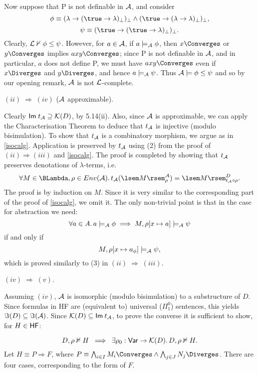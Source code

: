 Now suppose that {\sf P} is not definable in $\cal A$, and consider
\[ \phi \equiv (\lambda \rightarrow (\true \rightarrow \lambda )_{\bot})_{\bot} \wedge (\true \rightarrow ( \lambda \rightarrow \lambda )_{\bot})_{\bot} , \]
\[ \psi \equiv (\true \rightarrow (\true \rightarrow \lambda )_{\bot})_{\bot} . \]
Clearly, ${\cal L} \nvdash \phi \leq \psi$. 
However, for $a \in {\cal A}$, if $a \models_{\cal A} \phi$, then $x \Converges$ or $y \Converges$ implies $a x y \Converges$; 
since {\sf P} is not definable in $\cal A$, and in particular, $a$ does not define {\sf P}, we must have $a x y \Converges$ even if $x \Diverges$ and $y \Diverges$, and hence $a \models_{\cal A} \psi$. 
Thus ${\cal A} \models \phi \leq \psi$ and so by our opening remark, $\cal A$ is not $\cal L$-complete.

\noindent $(ii) \; \Longrightarrow \; (iv)$ ($\cal A$ approximable).

Clearly ${\sf Im} \; t_{\cal A} \supseteq  {\cal K}(D)$, by 5.14(ii). 
Also, since $\cal A$ is approximable, we can apply the Characterisation Theorem 
to deduce that $t_{\cal A}$ is injective (modulo bisimulation). 
To show that $t_{\cal A}$ is a combinatory morphism, we argue as in 
\ref{isocalg}. 
Application is preserved by $t_{\cal A}$ using (2) from the proof of 
$(ii)  \Rightarrow  (iii)$ and \ref{isocalg}. 
The proof is completed by showing that $t_{\cal A}$ preserves denotations of 
$\lambda$-terms, i.e.
\[ \forall M \in \BLambda , \rho \in Env({\cal A}) . \, t_{\cal A} (\lsem M \rsem^{\cal A}_{\rho}) = \lsem M \rsem^{D}_{t_{\cal A} \circ \rho } . \]
The proof is by induction on $M$. 
Since it is very similar to the corresponding part of the proof of \ref{isocalg}, we omit it. 
The only non-trivial point is that in the case for abstraction we need:
\[ \forall a \in A. \, a \models_{\cal A} \phi \; \Longrightarrow \; M, \rho [x \mapsto a ] \models_{\cal A} \psi \]
if and only if
\[ M, \rho [ x \mapsto a_{\phi}] \models_{\cal A} \psi , \]
which is proved similarly to (3) in $(ii) \; \Rightarrow \; (iii)$.

\noindent $(iv) \; \Longrightarrow \; (v)$.

Assuming $(iv)$, $\cal A$ is isomorphic (modulo bisimulation) to a substructure of $D$. 
Since formulas in {\sf HF} are (equivalent to) universal ($\Pi^{0}_{1}$) 
sentences, this yields ${\Im}(D) \subseteq {\Im}({\cal A})$. 
Since ${\cal K}(D) \subseteq {\sf Im}\: t_{\cal A}$, to prove the converse it is sufficient to show, for $H \in {\sf HF}$:

\[ D, \rho \nvDash H \;\; \Longrightarrow \;\; \exists \rho_{0} : {\sf Var} \rightarrow {\cal K}(D). \, D, \rho \nvDash H . \]
Let $H \equiv P \Rightarrow F$, where $P \equiv \bigwedge_{i \in I}M_{i} \Converges \wedge \bigwedge_{j \in J}N_{j} \Diverges$. There are four cases, corresponding to the form of $F$.

